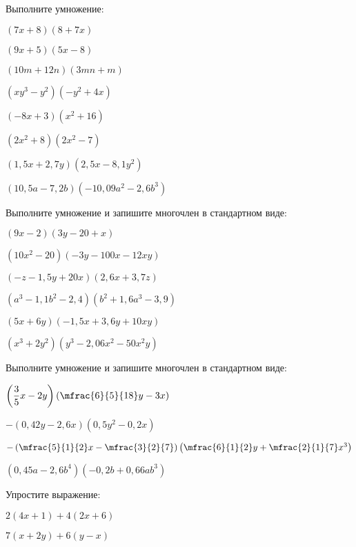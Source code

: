 %
%
\begin{class}[number=5]
	\begin{listofex}
		\item Выполните умножение:
		\begin{enumcols}[itemcolumns=2]
			\item \( (7x+8)(8+7x) \)
			\item \( (9x+5)(5x-8) \)
			\item \( (10m+12n)(3mn+m) \)
			\item \( (xy^3-y^2)(-y^2+4x) \)
			\item \( (-8x+3)(x^2+16) \)
			\item \( (2x^2+8)(2x^2-7) \)
			\item \( (1,5x+2,7y)(2,5x-8,1y^2) \)
			\item \( (10,5a-7,2b)(-10,09a^2-2,6b^3) \)
		\end{enumcols}
		\item Выполните умножение и запишите многочлен в стандартном виде:
		\begin{enumcols}[itemcolumns=2]
			\item \( (9x-2)(3y-20+x) \)
			\item \( (10x^2-20)(-3y-100x-12xy) \)
			\item \( (-z-1,5y+20x)(2,6x+3,7z) \)
			\item \( (a^3-1,1b^2-2,4)(b^2+1,6a^3-3,9) \)
			\item \( (5x+6y)(-1,5x+3,6y+10xy) \)
			\item \( (x^3+2y^2)(y^3-2,06x^2-50x^2y) \)
		\end{enumcols}
		\item Выполните умножение и запишите многочлен в стандартном виде:
		\begin{enumcols}[itemcolumns=2]
			\item \( \left( \dfrac{3}{5}x-2y \right)\left( \mfrac{6}{5}{18}y-3x \right) \)
			\item \( -(0,42y-2,6x)(0,5y^2-0,2x) \)
			\item \( -\left( \mfrac{5}{1}{2}x-\mfrac{3}{2}{7} \right)\left( \mfrac{6}{1}{2}y+\mfrac{2}{1}{7}x^3 \right) \)
			\item \( (0,45a-2,6b^4)(-0,2b+0,66ab^3) \)
		\end{enumcols}
		\item Упростите выражение:
		\begin{enumcols}[itemcolumns=2]
			\item \( 2(4x+1)+4(2x+6) \)
			\item \( 7(x+2y)+6(y-x) \)

\end{enumcols}
\end{listofex}
\end{class}
